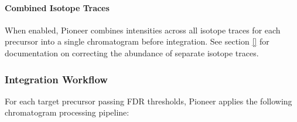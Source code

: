 \documentclass[pdflatex,sn-nature]{sn-jnl}
\begin{document}
\paragraph{Combined Isotope Traces}\label{para:combined-isotope-traces} When enabled, Pioneer combines intensities across all isotope traces for each precursor into a single chromatogram before integration. See section \ref{} for documentation on correcting the abundance of separate isotope traces.

\subsubsection{Integration Workflow}\label{subsubsec:integration-workflow}

For each target precursor passing FDR thresholds, Pioneer applies the following chromatogram processing pipeline:
\end{document}
